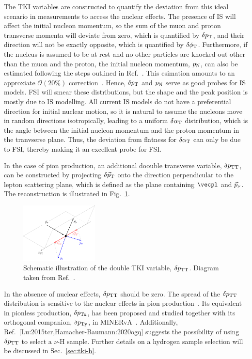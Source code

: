 The TKI variables are constructed to quantify the deviation from this ideal scenario in measurements to access the nuclear effects. 
The presence of IS will affect the initial nucleon momentum, so the sum of the muon and proton transverse momenta will deviate from zero, which is quantified by $\delta p_\textrm{T}$, and their direction will not be exactly opposite, which is quantified by $\delta\phi_\textrm{T}$.
Furthermore, if the nucleus is assumed to be at rest and no other particles are knocked out other than the muon and the proton, the initial nucleon momentum, $p_\textrm{N}$, can also be estimated following the steps outlined in Ref.~\cite{Furmanski:2016wqo, Lu:2019nmf}. 
This esimation amounts to an approxiate  $\mathcal{O}(20\%)$ correction~\cite{Yang:2023dxk}. 
Hence, $\delta p_\textrm{T}$ and $p_\textrm{N}$ serve as good probes for IS models.
FSI will smear these distributions, but the shape and the peak position is mostly due to IS modelling.
All current IS models do not have a preferential direction for initial nuclear motion, so it is natural to assume the nucleons move in random directions isotropically, leading to a uniform $\delta\alpha_\textrm{T}$ distribution, which is the angle between the initial nucleon momentum and the proton momentum in the tranvserse plane. 
Thus, the deviation from flatness for $\delta\alpha_\textrm{T}$ can only be due to FSI, thereby making it an excellent probe for FSI. 
 
In the case of pion production, an additional doouble transverse variable, $\delta p_\textrm{TT}$, can be constructed by projecting $\delta \vec{p}_\textrm{T}$ onto the direction perpendicular to the lepton scattering plane, which is defined as the plane containing $\vecpl$ and $\vec{p}_{\nu}$.
The reconstruction is illustrated in Fig.~\ref{fig:dtki}.
\begin{figure}
    \centering
    \includegraphics[width=0.35\textwidth]{figures/dptt.pdf}
    \caption{\label{fig:dtki} Schematic illustration of the double TKI variable, $\delta p_\textrm{TT}$. Diagram taken from Ref.~\cite{T2K:2021naz}.}
\end{figure}
In the absence of nuclear effects, $\delta p_\textrm{TT}$ should be zero.
The spread of the $\delta p_\textrm{TT}$ distribution is sensitive to the nuclear effects in pion production~\cite{MINERvA:2020anu, T2K:2021naz}.
Its equivalent in pionless production, $\delta p_\textrm{Tx}$, has been proposed and studied together with its orthogonal companion, $\delta p_\textrm{Ty}$, in MINERvA~\cite{MINERvA:2019ope}.
Additionally, Ref.~\ref{Lu:2015tcr,Hamacher-Baumann:2020ogq} suggests the possibility of using $\delta p_\textrm{TT}$ to select a $\nu$-H sample.
Further details on a hydrogen sample selection will be discussed in Sec.~\ref{sec:tki-h}.

